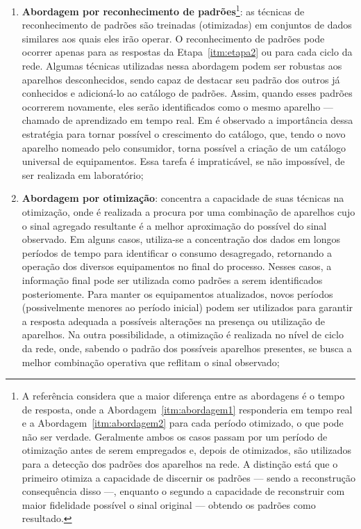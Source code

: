 \begin{enumerate}[label={Abordagem} \arabic* - ,ref=\arabic*,align=left]
\item\label{itm:abordagem1}\textbf{Abordagem por reconhecimento de
padrões}\footnote{A referência considera
que a maior diferença entre as abordagens é o tempo de resposta, onde
a Abordagem~\ref{itm:abordagem1} responderia em tempo real e a
Abordagem~\ref{itm:abordagem2} para cada período otimizado, o que pode
não ser verdade. Geralmente ambos os casos passam por um período de
otimização antes de serem empregados e, depois de otimizados, são
utilizados para a detecção dos padrões dos aparelhos na rede. A
distinção está que o primeiro otimiza a capacidade de
discernir os padrões --- sendo a reconstrução consequência disso ---,
enquanto o segundo a capacidade de reconstruir com maior fidelidade
possível o sinal original --- obtendo os padrões como
resultado.\label{fn:diff_abordagens}}: as técnicas de reconhecimento
de padrões são treinadas (otimizadas) em conjuntos de dados similares
aos quais eles irão operar. O reconhecimento de padrões pode ocorrer
apenas para as respostas da Etapa~\ref{itm:etapa2} ou para cada ciclo
da rede. Algumas técnicas utilizadas nessa abordagem podem ser
robustas aos aparelhos desconhecidos, sendo capaz de destacar seu padrão
dos outros já conhecidos e adicioná-lo ao catálogo de padrões. Assim,
quando esses padrões ocorrerem novamente, eles serão identificados
como o mesmo aparelho --- chamado de aprendizado em tempo real. Em
\cite{nilm_matthews_overview_2008_22} é observado a importância dessa
estratégia para tornar possível o crescimento do catálogo, que, tendo
o novo aparelho nomeado pelo consumidor, torna possível a criação de
um catálogo universal de equipamentos. Essa tarefa é impraticável, se
não impossível, de ser realizada em laboratório;
\item\label{itm:abordagem2}\textbf{Abordagem
por otimização}: concentra a capacidade de
suas técnicas na otimização, onde é realizada a procura por uma
combinação de aparelhos cujo o sinal agregado resultante é a melhor
aproximação do possível do sinal observado. Em alguns casos,
utiliza-se a concentração dos dados em longos períodos de tempo para
identificar o consumo desagregado, retornando a operação dos diversos
equipamentos no final do processo. Nesses casos, a informação final
pode ser utilizada como padrões a serem identificados posteriomente.
Para manter os equipamentos atualizados, novos períodos (possivelmente
menores ao período inicial) podem ser utilizados para garantir a
resposta adequada a possíveis alterações na presença ou utilização de
aparelhos. Na outra possibilidade, a otimização é realizada no nível
de ciclo da rede, onde, sabendo o padrão dos possíveis aparelhos
presentes, se busca a melhor combinação operativa que reflitam o sinal
observado;
\end{enumerate}

